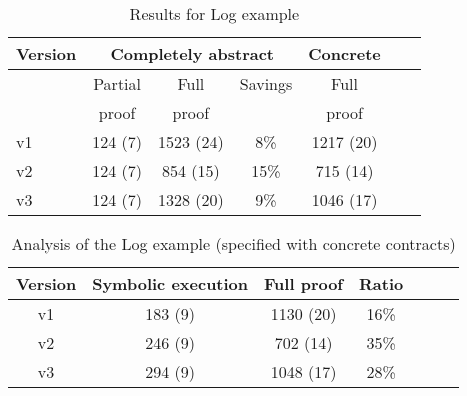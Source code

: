 \documentclass{report}
\begin{document}
\begin{table}
\begin{center}
\begin{tabular}{l@{\quad}c@{\quad}c@{\quad}c@{\quad}ccc}
\toprule
Version & \multicolumn{3}{c}{Completely abstract} & Concrete\\ \midrule
 	 		 & Partial 		& Full 			& Savings 	& Full \\ 
   			 & proof 		& proof 			&   				& proof \\ \midrule
v1	 		 & 124 (7) 		& 1523 (24)  	& 8\%     		& 1217 (20)		\\ \midrule
v2			 & 124 (7)     & 854 (15) 	& 15\%   		& 715 (14) 		\\ \midrule
v3    		 & 124 (7)     & 1328 (20)  	& 9\%    		& 1046 (17)		\\ \bottomrule
\end{tabular}
\end{center}
\caption{Results for {Log} example}\label{tbl:account-savings}

\label{tbl:student-se-ratio}
\end{table}


\begin{table}\centering
\begin{center}
\begin{tabular}{c@{\quad}c@{\quad}c@{\quad}c@{\quad}c@{\quad}cc}
\toprule
Version	& Symbolic execution	& Full proof 	& Ratio 		\\ \midrule
v1			& 183 (9) 						& 1130 (20)  	& 16\%    		\\ \midrule
v2			& 246 (9)     				     & 702 (14)  	& 35\%    		\\ \midrule
v3    		& 294 (9)                  	     & 1048 (17)  & 28\%    		\\ \bottomrule 
\end{tabular}
\end{center}
\caption{Analysis of the {Log} example (specified with concrete contracts)}
\label{tbl:account-se-ratio}
\end{table}
\end{document}
